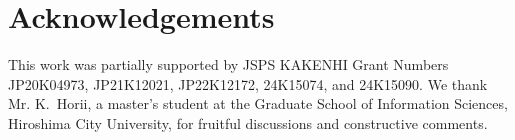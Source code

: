 \section*{Acknowledgements}
This work was partially supported by JSPS KAKENHI Grant Numbers JP20K04973, JP21K12021, JP22K12172, 24K15074, and 24K15090. 
We thank Mr. K.~Horii, a master's student at the Graduate School of Information Sciences, Hiroshima City University, for fruitful discussions and constructive comments.%
